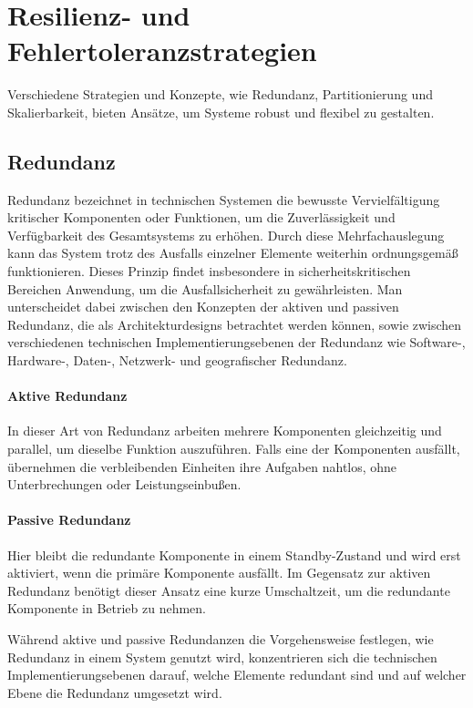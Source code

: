 \section{Resilienz- und Fehlertoleranzstrategien}


Verschiedene Strategien und Konzepte, wie Redundanz, Partitionierung und Skalierbarkeit,
bieten Ansätze, um Systeme robust und flexibel zu gestalten.

\subsection{Redundanz}

Redundanz bezeichnet in technischen Systemen die bewusste Vervielfältigung kritischer Komponenten oder Funktionen,
um die Zuverlässigkeit und Verfügbarkeit des Gesamtsystems zu erhöhen.
Durch diese Mehrfachauslegung kann das System trotz des Ausfalls einzelner Elemente weiterhin ordnungsgemäß
funktionieren.
Dieses Prinzip findet insbesondere in sicherheitskritischen Bereichen Anwendung, um die Ausfallsicherheit
zu gewährleisten.
Man unterscheidet dabei zwischen den Konzepten der aktiven und passiven Redundanz, die als Architekturdesigns
betrachtet werden können, sowie zwischen verschiedenen technischen Implementierungsebenen der Redundanz wie Software-,
Hardware-, Daten-, Netzwerk- und geografischer Redundanz.

\paragraph{Aktive Redundanz}
In dieser Art von Redundanz arbeiten mehrere Komponenten gleichzeitig und parallel, um dieselbe Funktion auszuführen.
Falls eine der Komponenten ausfällt, übernehmen die verbleibenden Einheiten ihre Aufgaben nahtlos, ohne Unterbrechungen
oder Leistungseinbußen.

\paragraph{Passive Redundanz}
Hier bleibt die redundante Komponente in einem Standby-Zustand und wird erst aktiviert, wenn die primäre Komponente ausfällt.
Im Gegensatz zur aktiven Redundanz benötigt dieser Ansatz eine kurze Umschaltzeit, um die redundante Komponente in
Betrieb zu nehmen.

Während aktive und passive Redundanzen die Vorgehensweise festlegen, wie Redundanz in einem System genutzt wird,
konzentrieren sich die technischen Implementierungsebenen darauf, welche Elemente redundant sind und auf welcher Ebene
die Redundanz umgesetzt wird.


